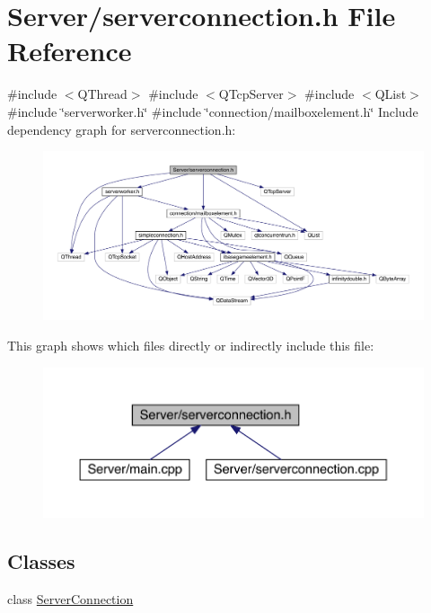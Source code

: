 \hypertarget{a00104}{}\section{Server/serverconnection.h File Reference}
\label{a00104}
{\ttfamily \#include $<$Q\+Thread$>$}\newline
{\ttfamily \#include $<$Q\+Tcp\+Server$>$}\newline
{\ttfamily \#include $<$Q\+List$>$}\newline
{\ttfamily \#include \char`\"{}serverworker.\+h\char`\"{}}\newline
{\ttfamily \#include \char`\"{}connection/mailboxelement.\+h\char`\"{}}\newline
Include dependency graph for serverconnection.\+h\+:
\nopagebreak
\begin{figure}[H]
\begin{center}
\leavevmode
\includegraphics[width=350pt]{d3/d32/a00105}
\end{center}
\end{figure}
This graph shows which files directly or indirectly include this file\+:
\nopagebreak
\begin{figure}[H]
\begin{center}
\leavevmode
\includegraphics[width=350pt]{d7/d70/a00106}
\end{center}
\end{figure}
\subsection*{Classes}
\begin{DoxyCompactItemize}
\item 
class \hyperlink{a00181}{Server\+Connection}
\end{DoxyCompactItemize}
